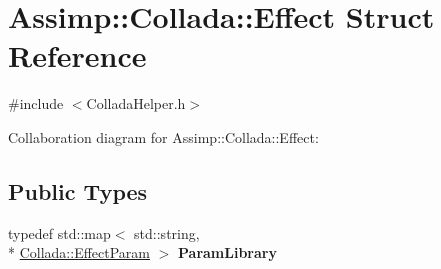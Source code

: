 \hypertarget{struct_assimp_1_1_collada_1_1_effect}{\section{Assimp\+:\+:Collada\+:\+:Effect Struct Reference}
\label{struct_assimp_1_1_collada_1_1_effect}
}


{\ttfamily \#include $<$Collada\+Helper.\+h$>$}



Collaboration diagram for Assimp\+:\+:Collada\+:\+:Effect\+:
\subsection*{Public Types}
\begin{DoxyCompactItemize}
\item 
\hypertarget{struct_assimp_1_1_collada_1_1_effect_abc4376a83e2664446d16d3f094082016}{typedef std\+::map$<$ std\+::string, \\*
\hyperlink{struct_assimp_1_1_collada_1_1_effect_param}{Collada\+::\+Effect\+Param} $>$ {\bfseries Param\+Library}}\label{struct_assimp_1_1_collada_1_1_effect_abc4376a83e2664446d16d3f094082016}

\end{DoxyCompactItemize}
